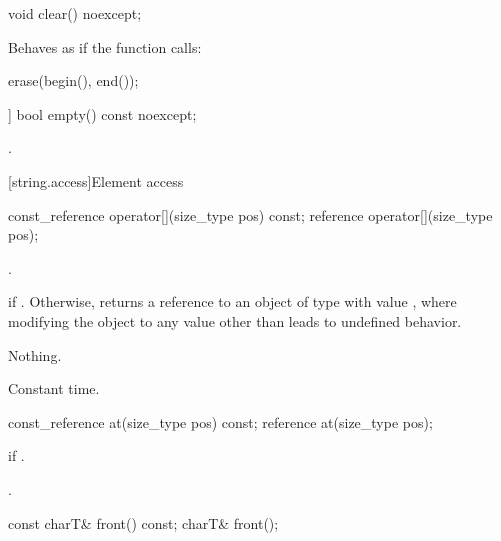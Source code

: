 %
\begin{itemdecl}
void clear() noexcept;
\end{itemdecl}

\begin{itemdescr}
\pnum
\effects
Behaves as if the function calls:

\begin{codeblock}
erase(begin(), end());
\end{codeblock}
\end{itemdescr}

%
\begin{itemdecl}
[[nodiscard]] bool empty() const noexcept;
\end{itemdecl}

\begin{itemdescr}
\pnum
\returns
{}.
\end{itemdescr}

[string.access]{Element access}

%
\begin{itemdecl}
const_reference operator[](size_type pos) const;
reference       operator[](size_type pos);
\end{itemdecl}

\begin{itemdescr}
\pnum
\requires {}.

\pnum
\returns {} if . Otherwise,
returns a reference to an object of type  with value
, where modifying the object to any value other than
 leads to undefined behavior.

\pnum
\throws Nothing.

\pnum
\complexity Constant time.
\end{itemdescr}

%
\begin{itemdecl}
const_reference at(size_type pos) const;
reference       at(size_type pos);
\end{itemdecl}

\begin{itemdescr}
\pnum
\throws
{}
if
.

\pnum
\returns
{}.
\end{itemdescr}

%
\begin{itemdecl}
const charT& front() const;
charT& front();
\end{itemdecl}

